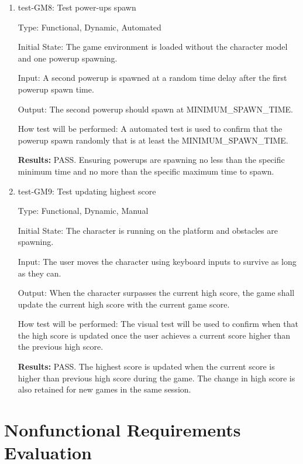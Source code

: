 \documentclass[12pt, titlepage]{article}
\begin{document}
\begin{enumerate}
\item{test-GM8: Test power-ups spawn\\}

Type: Functional, Dynamic, Automated
					
Initial State: The game environment is loaded without the character model and one powerup spawning.
					
Input: A second powerup is spawned at a random time delay after the first powerup spawn time.

Output: The second powerup should spawn at MINIMUM\_SPAWN\_TIME.
					
How test will be performed: A automated test is used to confirm that the powerup spawn randomly that is at least the MINIMUM\_SPAWN\_TIME.


\textbf{Results:} PASS. Ensuring powerups are spawning no less than the specific minimum time and no more than the specific maximum time to spawn. 

\item{test-GM9: Test updating highest score\\}

Type: Functional, Dynamic, Manual
					
Initial State: The character is running on the platform and obstacles are spawning.
					
Input: The user moves the character using keyboard inputs to survive as long as they can.
					
Output: When the character surpasses the current high score, the game shall update the current high score with the current game score.
					
How test will be performed: The visual test will be used to confirm when that the high score is updated once the user achieves a current score higher than the previous high score.

\textbf{Results:} PASS. The highest score is updated when the current score is higher than previous high score during the game. The change in high score is also retained for new games in the same session.

\end{enumerate}			

\section{Nonfunctional Requirements Evaluation}
\end{document}
